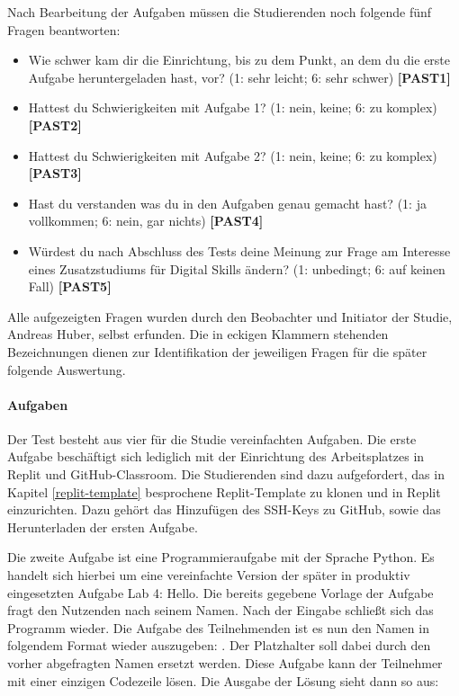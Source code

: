 Nach Bearbeitung der Aufgaben müssen die Studierenden noch folgende fünf
Fragen beantworten:

\begin{itemize}
    \item Wie schwer kam dir die Einrichtung, bis zu dem Punkt, an dem du die
    erste Aufgabe heruntergeladen hast, vor? (1: sehr leicht; 6: sehr schwer)
    \textbf{[PAST1]}
    \item Hattest du Schwierigkeiten mit Aufgabe 1? (1: nein, keine; 6: zu
    komplex) \textbf{[PAST2]}
    \item Hattest du Schwierigkeiten mit Aufgabe 2? (1: nein, keine; 6: zu
    komplex) \textbf{[PAST3]}
    \item Hast du verstanden was du in den Aufgaben genau gemacht hast? (1: ja
    vollkommen; 6: nein, gar nichts) \textbf{[PAST4]}
    \item Würdest du nach Abschluss des Tests deine Meinung zur Frage am
    Interesse eines Zusatzstudiums für Digital Skills ändern? (1: unbedingt;
    6: auf keinen Fall) \textbf{[PAST5]}
\end{itemize}

Alle aufgezeigten Fragen wurden durch den Beobachter und Initiator der Studie,
Andreas Huber, selbst erfunden. Die in eckigen Klammern stehenden Bezeichnungen
dienen zur Identifikation der jeweiligen Fragen für die später folgende
Auswertung.

\paragraph{Aufgaben}
Der Test besteht aus vier für die Studie vereinfachten Aufgaben. Die erste
Aufgabe beschäftigt sich lediglich mit der Einrichtung des Arbeitsplatzes in
Replit und GitHub-Classroom. Die Studierenden sind dazu aufgefordert, das in 
Kapitel \ref{replit-template} besprochene Replit-Template zu klonen und in 
Replit einzurichten. Dazu gehört das Hinzufügen des SSH-Keys zu GitHub, sowie
das Herunterladen der ersten Aufgabe.

Die zweite Aufgabe ist eine Programmieraufgabe mit der Sprache Python. Es
handelt sich hierbei um eine vereinfachte Version der später in produktiv
eingesetzten Aufgabe \glqq Lab 4: Hello\grqq{}. Die bereits gegebene Vorlage der
Aufgabe fragt den Nutzenden nach seinem Namen. Nach der Eingabe schließt sich
das Programm wieder. Die Aufgabe des Teilnehmenden ist es nun den Namen in
folgendem Format wieder auszugeben: . Der
Platzhalter  soll dabei durch den vorher abgefragten Namen ersetzt
werden. Diese Aufgabe kann der Teilnehmer mit einer einzigen Codezeile lösen.
Die Ausgabe der Lösung sieht dann so aus:

